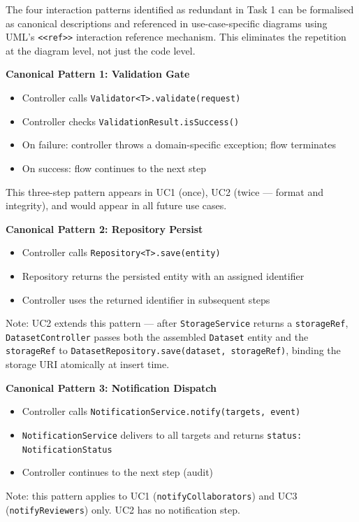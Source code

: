 \documentclass[12pt,a4paper]{article}
\newcommand{\code}[1]{\texttt{\small #1}}
\begin{document}
The four interaction patterns identified as redundant in Task 1 can be formalised as canonical descriptions and referenced in use-case-specific diagrams using UML's \code{<<ref>>} interaction reference mechanism. This eliminates the repetition at the diagram level, not just the code level.

\noindent\textbf{Canonical Pattern 1: Validation Gate}
\begin{itemize}
  \item Controller calls \code{Validator<T>.validate(request)}
  \item Controller checks \code{ValidationResult.isSuccess()}
  \item On failure: controller throws a domain-specific exception; flow terminates
  \item On success: flow continues to the next step
\end{itemize}

\noindent This three-step pattern appears in UC1 (once), UC2 (twice --- format and integrity), and would appear in all future use cases.

\noindent\textbf{Canonical Pattern 2: Repository Persist}
\begin{itemize}
  \item Controller calls \code{Repository<T>.save(entity)}
  \item Repository returns the persisted entity with an assigned identifier
  \item Controller uses the returned identifier in subsequent steps
\end{itemize}

\noindent Note: UC2 extends this pattern --- after \code{StorageService} returns a \code{storageRef}, \code{DatasetController} passes both the assembled \code{Dataset} entity and the \code{storageRef} to \code{DatasetRepository.save(dataset, storageRef)}, binding the storage URI atomically at insert time.

\noindent\textbf{Canonical Pattern 3: Notification Dispatch}
\begin{itemize}
  \item Controller calls \code{NotificationService.notify(targets, event)}
  \item \code{NotificationService} delivers to all targets and returns \code{status: NotificationStatus}
  \item Controller continues to the next step (audit)
\end{itemize}

\noindent Note: this pattern applies to UC1 (\code{notifyCollaborators}) and UC3 (\code{notifyReviewers}) only. UC2 has no notification step.
\end{document}
